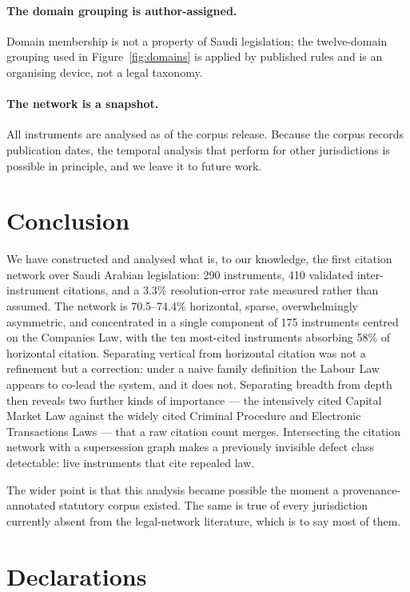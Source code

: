 \documentclass[sn-basic]{sn-jnl}%
\newif\ifanon
\begin{document}
\paragraph{The domain grouping is author-assigned.}
Domain membership is not a property of Saudi legislation; the twelve-domain
grouping used in Figure~\ref{fig:domains} is applied by published rules and
is an organising device, not a legal taxonomy.

\paragraph{The network is a snapshot.}
All instruments are analysed as of the corpus release. Because the corpus
records publication dates, the temporal analysis that
\citet{coupette2021measuring} perform for other jurisdictions is possible in
principle, and we leave it to future work.

\section{Conclusion}
\label{sec:conclusion}

We have constructed and analysed what is, to our knowledge, the first
citation network over Saudi
Arabian legislation: 290 instruments, 410 validated inter-instrument
citations, and a 3.3\% resolution-error rate measured rather than assumed.
The network is 70.5--74.4\% horizontal, sparse, overwhelmingly asymmetric,
and concentrated in a single component of 175 instruments centred on the
Companies Law, with the ten most-cited instruments absorbing 58\% of
horizontal citation. Separating vertical from horizontal citation was not a
refinement but a correction: under a naive family definition the Labour Law
appears to co-lead the system, and it does not. Separating breadth from
depth then reveals two further kinds of importance --- the intensively cited
Capital Market Law against the widely cited Criminal Procedure and
Electronic Transactions Laws --- that a raw citation count merges. Intersecting the citation network with
a supersession graph makes a previously invisible defect class detectable:
live instruments that cite repealed law.

The wider point is that this analysis became possible the moment a
provenance-annotated statutory corpus existed. The same is true of every
jurisdiction currently absent from the legal-network literature, which is to
say most of them.

\ifanon\else
\section*{Declarations}
\end{document}
